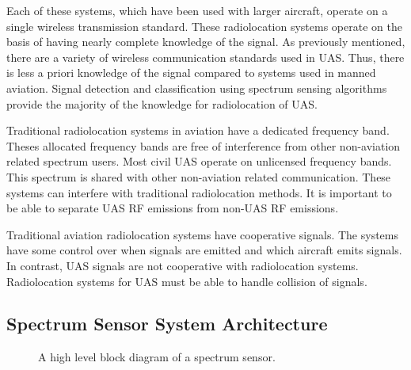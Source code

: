 \documentclass[journal,transmag]{IEEEtran}
\begin{document}
Each of these systems, which have been used with larger aircraft, operate on a single wireless transmission standard. These radiolocation systems operate on the basis of having nearly complete knowledge of the signal. As previously mentioned, there are a variety of wireless communication standards used in UAS. Thus, there is less a priori knowledge of the signal compared to systems used in manned aviation. Signal detection and classification using spectrum sensing algorithms provide the majority of the knowledge for radiolocation of UAS.

Traditional radiolocation systems in aviation have a dedicated frequency band. Theses allocated frequency bands are free of interference from other non-aviation related spectrum users. Most civil UAS operate on unlicensed frequency bands. This spectrum is shared with other non-aviation related communication. These systems can interfere with traditional radiolocation methods. It is important to be able to separate UAS RF emissions from non-UAS RF emissions.

Traditional aviation radiolocation systems have cooperative signals. The systems have some control over when signals are emitted and which aircraft emits signals. In contrast, UAS signals are not cooperative with radiolocation systems. Radiolocation systems for UAS must be able to handle collision of signals.

\subsection{Spectrum Sensor System Architecture}

\begin{figure}[htbp]
\caption{A high level block diagram of a spectrum sensor.}
\label{fig}
\end{figure}
\end{document}
